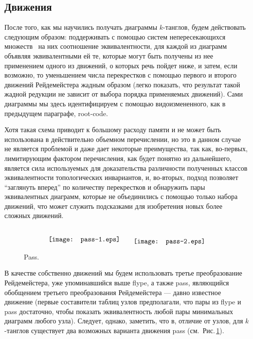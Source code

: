 \documentclass[12pt]{article}
\theoremstyle{plain}
\theoremstyle{definition}
\def\figureref#1{Рис.\,\protect\ref{#1}}
\def\RC{\hbox{root-code}}
\begin{document}
	\subsection{Движения}

		После того, как мы научились получать диаграммы $k$-танглов, будем действовать следующим образом: поддерживать с помощью
		систем непересекающихся множеств~\cite{CormenLeisersonRivestStein2009, Sedgewick1983} на них соотношение эквивалентности, для
		каждой из диаграмм объявляя эквивалентными ей те, которые могут быть получены из нее применением одного из движений, о которых
		речь пойдет ниже, и затем, если возможно, то уменьшением числа перекрестков с помощью первого и второго движений Рейдемейстера
		жадным образом (легко показать, что результат такой жадной редукции не зависит от выбора порядка применяемых движений). Сами
		диаграммы мы здесь идентифицируем с помощью видоизмененного, как в предыдущем параграфе, \RC{}.

		Хотя такая схема приводит к большому расходу памяти и не может быть использована в действительно объемном перечислении, но это
		в данном случае не является проблемой и даже дает некоторые преимущества, так как, во-первых, лимитирующим фактором перечисления,
		как будет понятно из дальнейшего, является сила используемых для доказательства различности полученных классов эквивалентности
		топологических инвариантов, и, во-вторых, подход позволяет ``заглянуть вперед'' по количеству перекрестков и обнаружить пары
		эквивалентных диаграмм, которые не объединились с помощью только набора движений, что может служить подсказками для изобретения
		новых более сложных движений.

		\begin{figure}[ht]
			\centering
			$$
			{\raise-4mm\hbox{\protect\texttt{[image: pass-1.eps]}}}
			\qquad
			{\raise-5mm\hbox{\protect\texttt{[image: pass-2.eps]}}}
			$$
			\caption{\footnotesize Pass.\label{figure:pass}}
		\end{figure}

		В качестве собственно движений мы будем использовать третье преобразование Рейдемейстера, уже упоминавшийся выше flype, а также
		pass, являющийся обобщением третьего преобразования Рейдемейстера --- давно известное движение (первые составители таблиц узлов
		предполагали, что пары из flype и pass достаточно, чтобы показать эквивалентность любой пары минимальных диаграмм любого узла).
		Следует, однако, заметить, что в, отличие от узлов, для $k$-танглов существует два возможных варианта движения pass
		(см.~\figureref{figure:pass}).
\end{document}
